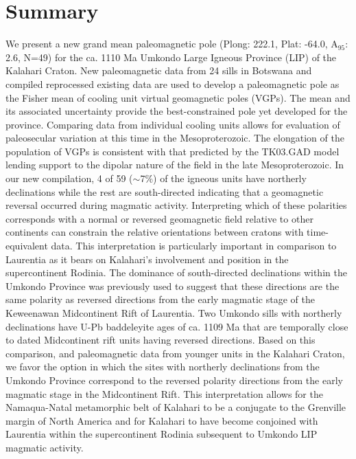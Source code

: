 \documentclass[11pt,letterpaper]{article}
\begin{document}
\section*{Summary}
We present a new grand mean paleomagnetic pole (Plong: 222.1\textdegree, Plat: -64.0\textdegree, A$_{95}$: 2.6\textdegree, N=49) for the ca. 1110 Ma Umkondo Large Igneous Province (LIP) of the Kalahari Craton. New paleomagnetic data from 24 sills in Botswana and compiled reprocessed existing data are used to develop a paleomagnetic pole as the Fisher mean of cooling unit virtual geomagnetic poles (VGPs). The mean and its associated uncertainty provide the best-constrained pole yet developed for the province. Comparing data from individual cooling units allows for evaluation of paleosecular variation at this time in the Mesoproterozoic. The elongation of the population of VGPs is consistent with that predicted by the TK03.GAD model lending support to the dipolar nature of the field in the late Mesoproterozoic. In our new compilation, 4 of 59 ($\sim$7$\%$) of the igneous units have northerly declinations while the rest are south-directed indicating that a geomagnetic reversal occurred during magmatic activity. Interpreting which of these polarities corresponds with a normal or reversed geomagnetic field relative to other continents can constrain the relative orientations between cratons with time-equivalent data. This interpretation is particularly important in comparison to Laurentia as it bears on Kalahari's involvement and position in the supercontinent Rodinia. The dominance of south-directed declinations within the Umkondo Province was previously used to suggest that these directions are the same polarity as reversed directions from the early magmatic stage of the Keweenawan Midcontinent Rift of Laurentia. Two Umkondo sills with northerly declinations have U-Pb baddeleyite ages of ca. 1109 Ma that are temporally close to dated Midcontinent rift units having reversed directions. Based on this comparison, and paleomagnetic data from younger units in the Kalahari Craton, we favor the option in which the sites with northerly declinations from the Umkondo Province correspond to the reversed polarity directions from the early magmatic stage in the Midcontinent Rift. This interpretation allows for the Namaqua-Natal metamorphic belt of Kalahari to be a conjugate to the Grenville margin of North America and for Kalahari to have become conjoined with Laurentia within the supercontinent Rodinia subsequent to Umkondo LIP magmatic activity.
\end{document}
